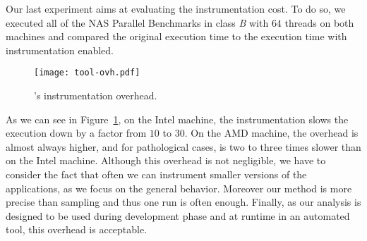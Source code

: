 Our last experiment aims at evaluating the instrumentation cost. To do so, we
executed all of the NAS Parallel Benchmarks in class \emph{B} with $64$
threads on both machines and compared the original execution time to the execution time with instrumentation enabled.

\begin{figure}[!htb]
    \centering
    \texttt{[image: tool-ovh.pdf]}
    \caption{\TABARNAC's instrumentation overhead.}
    \label{fig:ovh}
\end{figure}


As we can see in Figure~\ref{fig:ovh}, on the Intel machine,
the instrumentation slows the execution down by a factor from $10$ to $30$.
On the AMD machine, the overhead is almost always higher, and for
pathological cases, is two to three times slower than on
the Intel machine.
Although this overhead is not negligible, we have to consider the fact that often we can instrument
smaller versions of the applications, as we focus on the general behavior.
Moreover our method is more precise than sampling and
thus one run is often enough. Finally, as our
analysis is designed to be used during development phase and at runtime in an
automated tool, this overhead is acceptable.

